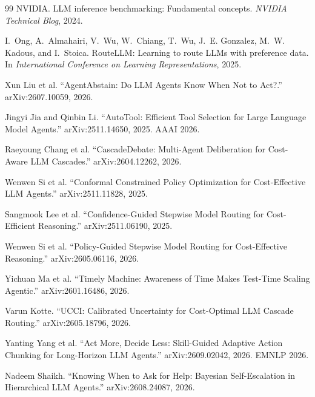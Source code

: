 \begin{thebibliography}{99}
NVIDIA.
\newblock LLM inference benchmarking: Fundamental concepts.
\newblock \emph{NVIDIA Technical Blog}, 2024.

I.~Ong, A.~Almahairi, V.~Wu, W.~Chiang, T.~Wu, J.~E. Gonzalez, M.~W. Kadous, and I.~Stoica.
\newblock RouteLLM: Learning to route LLMs with preference data.
\newblock In \emph{International Conference on Learning Representations}, 2025.

Xun Liu et al.
``AgentAbstain: Do LLM Agents Know When Not to Act?.''
arXiv:2607.10059, 2026.

Jingyi Jia and Qinbin Li.
``AutoTool: Efficient Tool Selection for Large Language Model Agents.''
arXiv:2511.14650, 2025. AAAI 2026.

Raeyoung Chang et al.
``CascadeDebate: Multi-Agent Deliberation for Cost-Aware LLM Cascades.''
arXiv:2604.12262, 2026.

Wenwen Si et al.
``Conformal Constrained Policy Optimization for Cost-Effective LLM Agents.''
arXiv:2511.11828, 2025.

Sangmook Lee et al.
``Confidence-Guided Stepwise Model Routing for Cost-Efficient Reasoning.''
arXiv:2511.06190, 2025.

Wenwen Si et al.
``Policy-Guided Stepwise Model Routing for Cost-Effective Reasoning.''
arXiv:2605.06116, 2026.

Yichuan Ma et al.
``Timely Machine: Awareness of Time Makes Test-Time Scaling Agentic.''
arXiv:2601.16486, 2026.

Varun Kotte.
``UCCI: Calibrated Uncertainty for Cost-Optimal LLM Cascade Routing.''
arXiv:2605.18796, 2026.

Yanting Yang et al.
``Act More, Decide Less: Skill-Guided Adaptive Action Chunking for Long-Horizon LLM Agents.''
arXiv:2609.02042, 2026. EMNLP 2026.

Nadeem Shaikh.
``Knowing When to Ask for Help: Bayesian Self-Escalation in Hierarchical LLM Agents.''
arXiv:2608.24087, 2026.
\end{thebibliography}


